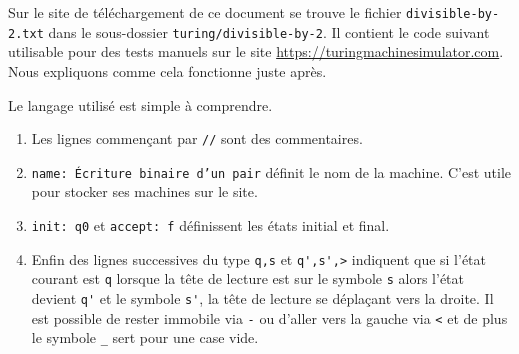 Sur le site de téléchargement de ce document se trouve le fichier \verb+divisible-by-2.txt+ dans le sous-dossier \verb+turing/divisible-by-2+.
Il contient le code suivant utilisable pour des tests manuels sur le site \url{https://turingmachinesimulator.com}. Nous expliquons comme cela fonctionne juste après.


Le langage utilisé est simple à comprendre.
\begin{enumerate}
    \item Les lignes commençant par \verb+//+ sont des commentaires.

    \item \verb+name: Écriture binaire d’un pair+ définit le nom de la machine. C'est utile pour stocker ses machines sur le site.

    \item \verb+init: q0+ et \verb+accept: f+ définissent les états initial et final.

    \item Enfin des lignes successives du type \verb+q,s+ et \verb+q',s',>+ indiquent que si l'état courant est \verb+q+ lorsque la tête de lecture est sur le symbole \verb+s+ alors l'état devient \verb+q'+ et le symbole \verb+s'+, la tête de lecture se déplaçant vers la droite.
    Il est possible de rester immobile via \verb+-+ ou d'aller vers la gauche via \verb+<+ et de plus le symbole \verb+_+ sert pour une case vide.
\end{enumerate}

